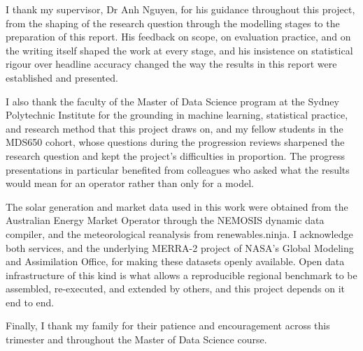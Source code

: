 I thank my supervisor, Dr Anh Nguyen, for his guidance throughout this project, from the shaping of the research question through the modelling stages to the preparation of this report. His feedback on scope, on evaluation practice, and on the writing itself shaped the work at every stage, and his insistence on statistical rigour over headline accuracy changed the way the results in this report were established and presented.

I also thank the faculty of the Master of Data Science program at the Sydney Polytechnic Institute for the grounding in machine learning, statistical practice, and research method that this project draws on, and my fellow students in the MDS650 cohort, whose questions during the progression reviews sharpened the research question and kept the project's difficulties in proportion. The progress presentations in particular benefited from colleagues who asked what the results would mean for an operator rather than only for a model.

The solar generation and market data used in this work were obtained from the Australian Energy Market Operator through the NEMOSIS dynamic data compiler, and the meteorological reanalysis from renewables.ninja. I acknowledge both services, and the underlying MERRA-2 project of NASA's Global Modeling and Assimilation Office, for making these datasets openly available. Open data infrastructure of this kind is what allows a reproducible regional benchmark to be assembled, re-executed, and extended by others, and this project depends on it end to end.

Finally, I thank my family for their patience and encouragement across this trimester and throughout the Master of Data Science course.
